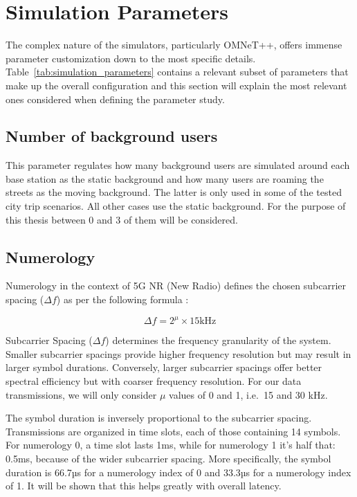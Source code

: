\section{Simulation Parameters}
The complex nature of the simulators, particularly OMNeT++, offers immense parameter customization down to the most specific details. Table~\ref{tab:simulation_parameters} contains a relevant subset of parameters that make up the overall configuration and this section will explain the most relevant ones considered when defining the parameter study.

\subsection{Number of background users}
This parameter regulates how many background users are simulated around each base station as the static background and how many users are roaming the streets as the moving background. The latter is only used in some of the tested city trip scenarios. All other cases use the static background.
For the purpose of this thesis between 0 and 3 of them will be considered.

\subsection{Numerology}

Numerology in the context of 5G NR (New Radio) defines the chosen subcarrier spacing ($\Delta f$) as per the following formula \cite{ETSITS138300}:

$$\Delta f=2^\mu \times 15\text{kHz}$$ 

Subcarrier Spacing ($\Delta f$) determines the frequency granularity of the system. Smaller subcarrier spacings provide higher frequency resolution but may result in larger symbol durations. Conversely, larger subcarrier spacings offer better spectral efficiency but with coarser frequency resolution.
For our data transmissions, we will only consider $\mu$ values of 0 and 1, i.e.\ 15 and 30 kHz.

The symbol duration is inversely proportional to the subcarrier spacing. Transmissions are organized in time slots, each of those containing 14 symbols. For numerology 0, a time slot lasts 1ms, while for numerology 1 it's half that: 0.5ms, because of the wider subcarrier spacing. More specifically, the symbol duration is 66.7µs for a numerology index of 0 and 33.3µs for a numerology index of 1. It will be shown that this helps greatly with overall latency.

